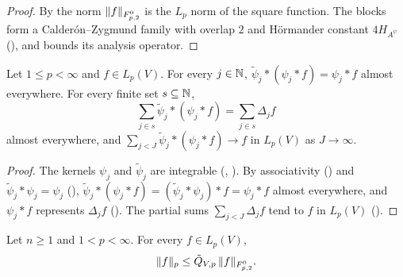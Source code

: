\begin{proof}
\leanok
By  the norm $\|f\|_{F^{0}_{p,2}}$ is the $L_p$ norm of the square
function. The blocks form a Calder\'on--Zygmund family with overlap $2$ and H\"ormander
constant $4 H_{A^{\psi}}$ (), and 
bounds its analysis operator.
\end{proof}

\begin{lemma}
\label{lem:square-function-reproducing}
\leanok
{}
Let $1 \leq p < \infty$ and $f \in L_p(V)$. For every $j \in \mathbb{N}$,
$\tilde\psi_j * (\psi_j * f) = \psi_j * f$ almost everywhere. For every finite set
$s \subseteq \mathbb{N}$,
\[
  \sum_{j \in s} \tilde\psi_j * (\psi_j * f) = \sum_{j \in s} \Delta_j f
\]
almost everywhere, and $\sum_{j < J} \tilde\psi_j * (\psi_j * f) \to f$ in $L_p(V)$ as
$J \to \infty$.
\end{lemma}

\begin{proof}
\leanok
The kernels $\psi_j$ and $\tilde\psi_j$ are integrable (,
). By associativity () and
$\tilde\psi_j * \psi_j = \psi_j$ (),
$\tilde\psi_j * (\psi_j * f) = (\tilde\psi_j * \psi_j) * f = \psi_j * f$ almost everywhere, and
$\psi_j * f$ represents $\Delta_j f$ (). The partial sums
$\sum_{j < J} \Delta_j f$ tend to $f$ in $L_p(V)$ ().
\end{proof}

\begin{theorem}
\label{thm:square-function-lower}
\leanok
{}
Let $n \geq 1$ and $1 < p < \infty$. For every $f \in L_p(V)$,
\[
  \|f\|_p \leq \tilde Q_{V,p} \, \|f\|_{F^{0}_{p,2}} .
\]
\end{theorem}

